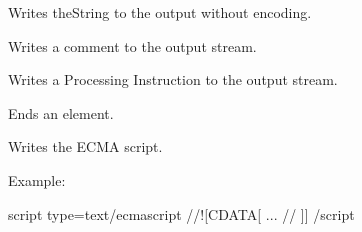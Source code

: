 \documentclass[letterpaper,10pt,english]{sphinxmanual}
\begin{document}
\begin{fulllineitems}
\begin{fulllineitems}
\end{fulllineitems}


\begin{fulllineitems}
\label{\detokenize{ref/util/XmlWrite:TotalDepth.util.XmlWrite.XmlStream.literal}}
Writes theString to the output without encoding.

\end{fulllineitems}


\begin{fulllineitems}
\label{\detokenize{ref/util/XmlWrite:TotalDepth.util.XmlWrite.XmlStream.comment}}
Writes a comment to the output stream.

\end{fulllineitems}


\begin{fulllineitems}
\label{\detokenize{ref/util/XmlWrite:TotalDepth.util.XmlWrite.XmlStream.pI}}
Writes a Processing Instruction to the output stream.

\end{fulllineitems}


\begin{fulllineitems}
\label{\detokenize{ref/util/XmlWrite:TotalDepth.util.XmlWrite.XmlStream.endElement}}
Ends an element.

\end{fulllineitems}


\begin{fulllineitems}
\label{\detokenize{ref/util/XmlWrite:TotalDepth.util.XmlWrite.XmlStream.writeECMAScript}}
Writes the ECMA script.

Example:

\begin{sphinxVerbatim}[commandchars=\\\{\}]
\PYGZlt{}script type=\PYGZdq{}text/ecmascript\PYGZdq{}\PYGZgt{}
//\PYGZlt{}![CDATA[
...
// ]]\PYGZgt{}
\PYGZlt{}/script\PYGZgt{}
\end{sphinxVerbatim}


\end{fulllineitems}
\end{fulllineitems}
\end{document}
